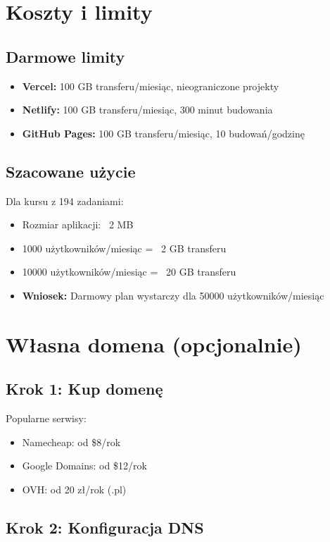 \documentclass[12pt,a4paper]{article}
\begin{document}
\section{Koszty i limity}

\subsection{Darmowe limity}
\begin{itemize}
    \item \textbf{Vercel:} 100 GB transferu/miesiąc, nieograniczone projekty
    \item \textbf{Netlify:} 100 GB transferu/miesiąc, 300 minut budowania
    \item \textbf{GitHub Pages:} 100 GB transferu/miesiąc, 10 budowań/godzinę
\end{itemize}

\subsection{Szacowane użycie}
Dla kursu z 194 zadaniami:
\begin{itemize}
    \item Rozmiar aplikacji: ~2 MB
    \item 1000 użytkowników/miesiąc = ~2 GB transferu
    \item 10000 użytkowników/miesiąc = ~20 GB transferu
    \item \textbf{Wniosek:} Darmowy plan wystarczy dla 50000 użytkowników/miesiąc
\end{itemize}

\section{Własna domena (opcjonalnie)}

\subsection{Krok 1: Kup domenę}
Popularne serwisy:
\begin{itemize}
    \item Namecheap: od \$8/rok
    \item Google Domains: od \$12/rok
    \item OVH: od 20 zł/rok (.pl)
\end{itemize}

\subsection{Krok 2: Konfiguracja DNS}
\end{document}
